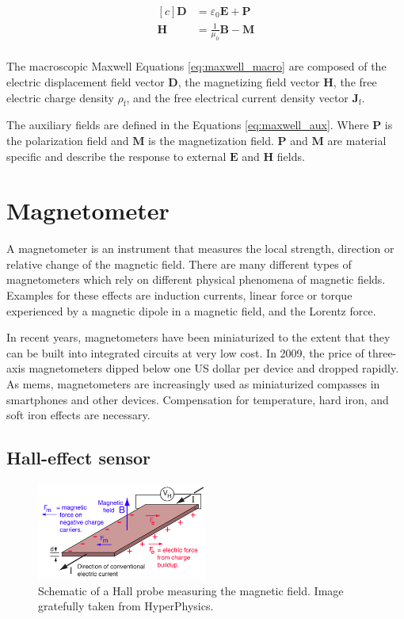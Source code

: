 \begin{equation}
\label{eq:maxwell_aux}
    \begin{aligned}[c]
        \bm{D} &= \varepsilon_0 \bm{E} + \bm{P}\\
        \bm{H} &= \frac{1}{\mu_0} \bm{B} - \bm{M}\\
    \end{aligned}
\end{equation}

The macroscopic Maxwell Equations \ref{eq:maxwell_macro} are composed of the electric displacement field vector $\bm{D}$, the magnetizing field vector $\bm{H}$, the free electric charge density $\rho_\text{f}$, and the free electrical current density vector $\bm{J}_\text{f}$.

The auxiliary fields are defined in the Equations \ref{eq:maxwell_aux}. Where $\bm{P}$ is the polarization field and $\bm{M}$ is the magnetization field. $\bm{P}$ and $\bm{M}$ are material specific and describe the response to external $\bm{E}$ and $\bm{H}$ fields.

\section{Magnetometer}

A magnetometer is an instrument that measures the local strength, direction or relative change of the magnetic field. There are many different types of magnetometers which rely on different physical phenomena of magnetic fields. Examples for these effects are induction currents, linear force or torque experienced by a magnetic dipole in a magnetic field, and the Lorentz force. 

In recent years, magnetometers have been miniaturized to the extent that they can be built into integrated circuits at very low cost. In 2009, the price of three-axis magnetometers dipped below one US dollar per device and dropped rapidly.\cite{magnetometer_price} As \gls{mems}, magnetometers are increasingly used as miniaturized compasses in smartphones and other devices. Compensation for temperature, hard iron, and soft iron effects are necessary.\cite{magnetometers}

\subsection{Hall-effect sensor}

\begin{figure}[hbt!]
    \centering
    \includegraphics[width=0.5\textwidth]{figures/hall_effect.png}
    \caption{Schematic of a Hall probe measuring the magnetic field. Image gratefully taken from HyperPhysics.\cite{hyperphysics_hall_image}}
    \label{fig:hall_effect}
\end{figure}

